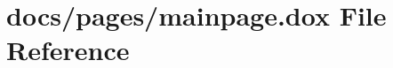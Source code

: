 \hypertarget{mainpage_8dox}{\section{docs/pages/mainpage.dox File Reference}
\label{mainpage_8dox}
}
